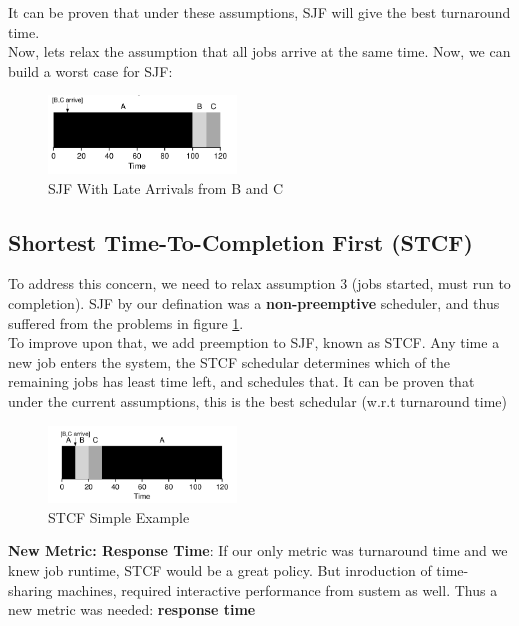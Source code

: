 It can be proven that under these assumptions, SJF will give the best
turnaround time.\\

Now, lets relax the assumption that all jobs arrive  at the same time. Now,
we can build a worst case for SJF:

\begin{figure}[h!]
    \begin{center}
        \includegraphics[width=5cm]{img/74}
        \caption{SJF With Late Arrivals from B and C}
        \label{74}
    \end{center}
\end{figure}

\subsection{Shortest Time-To-Completion First (STCF)}

To address this concern, we need to relax assumption 3 (jobs started, must run
to completion). SJF by our defination was a \textbf{non-preemptive} scheduler,
and thus suffered from the problems in figure \ref{74}.\\

To improve upon that, we add preemption to SJF, known as STCF. Any time
a new job enters the system, the STCF schedular determines which of the
remaining jobs has least time left, and schedules that. It can be proven
that under the current assumptions, this is the best schedular
(w.r.t turnaround time)

\begin{figure}[h!]
    \begin{center}
        \includegraphics[width=5cm]{img/75}
        \caption{STCF Simple Example}
    \end{center}
\end{figure}

\textbf{New Metric: Response Time}: If our only metric was turnaround time and
we knew job runtime, STCF would be a great policy. But inroduction of
time-sharing machines, required interactive performance from sustem as well.
Thus a new metric was needed: \textbf{response time}

